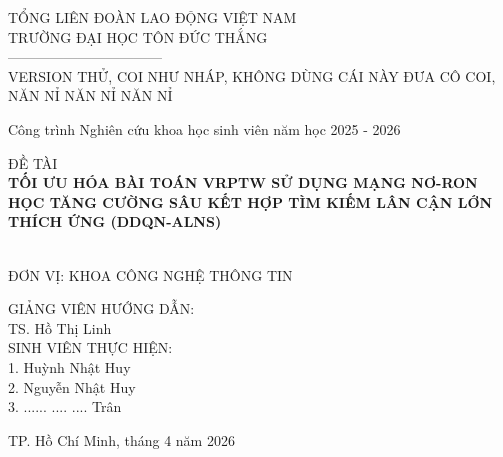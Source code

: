 \documentclass[13pt, a4paper]{extarticle} %
\begin{document}
\begin{titlepage}
    \thispagestyle{empty} %
    \begin{center}
        TỔNG LIÊN ĐOÀN LAO ĐỘNG VIỆT NAM \\
        TRƯỜNG ĐẠI HỌC TÔN ĐỨC THẮNG \\
        --------------------------------- \\
        \vspace{2.5cm}
            VERSION THỬ, COI NHƯ NHÁP, KHÔNG DÙNG CÁI NÀY ĐƯA CÔ COI, NĂN NỈ NĂN NỈ NĂN NỈ
            \vspace{1.5cm}
        
        Công trình Nghiên cứu khoa học sinh viên năm học 2025 - 2026 \\
        \vspace{1.5cm}
        
        ĐỀ TÀI \\
        \vspace{0.5cm}
        \textbf{\Large TỐI ƯU HÓA BÀI TOÁN VRPTW SỬ DỤNG MẠNG NƠ-RON HỌC TĂNG CƯỜNG SÂU KẾT HỢP TÌM KIẾM LÂN CẬN    LỚN THÍCH ỨNG (DDQN-ALNS)} 
        \vspace{1.5cm}
        \\ 
         \\
        \vspace{2.5cm}

        ĐƠN VỊ: KHOA CÔNG NGHỆ THÔNG TIN
        \vspace{2.5cm}
    \end{center}
      \begin{flushright}

    \end{flushright}
    \begin{flushleft}
        GIẢNG VIÊN HƯỚNG DẪN: \\
        TS. Hồ Thị Linh \\
        \vspace{0.8cm}
        SINH VIÊN THỰC HIỆN: \\
        1. Huỳnh Nhật Huy \\
        2. Nguyễn Nhật Huy \\
        3. ...... .... .... Trân

    \end{flushleft}
    
    \vfill
    \begin{center}
        TP. Hồ Chí Minh, tháng 4 năm 2026
    \end{center}
\end{titlepage}
\end{document}
